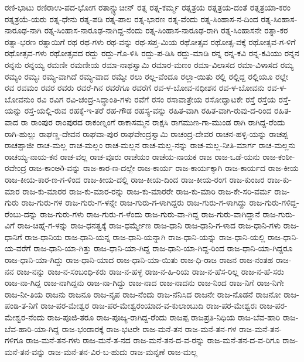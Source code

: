ರಣಿ-ಭಾಟು
ರಣಿರಾಉ-ಪದ-ಭೋಗ
ರತಾನ್ಚ್ಛುಚೀನ್
ರತ್ನ
ರತ್ನ-ಕರ್ಮ್ಮ
ರತ್ನತ್ರಯ
ರತ್ನತ್ರಯ-ದಂತೆ
ರತ್ನತ್ರಯಾ-ಕರಂ
ರತ್ನತ್ರಯೆ-ಯರು
ರತ್ನ-ಧೇನು
ರತ್ನ-ಪಡಿ
ರತ್ನ-ಪಾಲ
ರತ್ನ-ಭಾರಣ
ರತ್ನ-ವೆಂದು
ರತ್ನ-ಸಿಂಹಾಸ-ನ-ದಿಂದ
ರತ್ನ-ಸಿಂಹಾಸ-ನಾರೂಢ-ನಾಗಿ
ರತ್ನ-ಸಿಂಹಾಸ-ನಾರೂಢ-ನಾಗಿದ್ದ-ನೆಂದು
ರತ್ನ-ಸಿಂಹಾಸ-ನಾರೂಢ-ರಾಗಿ
ರತ್ನ-ಸಿಂಹಾಸನೇ
ರತ್ನಾ-ಕರ
ರತ್ನಾ-ಭರಣ
ರತ್ನಾಯಿಗೆ
ರಥ
ರಥ-ಗಳು
ರಥ-ವನ್ನು
ರಥ-ಸಪ್ತ-ಮಿಯ
ರಥೋತ್ಸವ
ರಥೋತ್ಸ-ವಕ್ಕೆ
ರಥೋತ್ಸವ-ಗ-ಳಿಗೆ
ರಥೋತ್ಸವ-ಗಳು
ರಥೋತ್ಸವದ
ರದ್ದು
ರದ್ದು-ಗೊ-ಳಿಸಿ
ರದ್ದು-ಪ-ಡಿಸಿ
ರದ್ದು-ಮಾಡಿ
ರನ್ನ
ರನ್ನ-ಕವಿ
ರನ್ನ-ಕವಿಯು
ರನ್ನನ
ರನ್ನನು
ರನ್ನಯ್ಯ
ರಮಣೀ
ರಮಣೀಯ
ರಮಾ-ನಾಥಸ್ವಾಮಿ
ರಮಾರ-ಮಣಂ
ರಮಾ-ವಿಲಾಸದ
ರಮಾ-ವಿಳಾಸದ
ರಮ್ಯ
ರಮ್ಯಂ
ರಮ್ಯಃ
ರಮ್ಯ-ವಾಗಿದೆ
ರಮ್ಯ-ವಾದ
ರಮ್ಯೇ
ರಲು
ರಲ್ಲ-ವೆಂದೂ
ರಲ್ಲಾ-ಯಿತು
ರಲ್ಲಿ
ರಲ್ಲಿದ್ದ
ರಲ್ಲಿಯೂ
ರಲ್ಲೇ
ರವ
ರವಮಂ
ರವರ
ರವರು
ರವರೆ-ಗಿನ
ರವರೆಗೂ
ರವರೆಗೆ
ರವ-ಳ-ಬೋವ-ನಧೀಶನ
ರವ-ಳ-ಬೋವನು
ರವ-ಳ-ಬೋವನುಂ
ರವಿ
ರವಿಗ
ರವಿ-ಚಂದ್ರ-ಸಿದ್ಧಾಂತಿ-ಗಳು
ರವೆಗೆ
ರಸಂ
ರಸಾವಾತ್ರೇಯ
ರಸೋದ್ಘಾಟಕೇ
ರಸ್ತೆ
ರಸ್ತೆಯ
ರಸ್ತೆ-ಯನ್ನು
ರಸ್ತೆ-ಯಲ್ಲಿ-ರುವ
ರಹಕ್ಕೆ-ಇ-ತರೆ
ರಹ-ಗೌಡ
ರಹಸ್ಯ-ವನ್ನು
ರಹಿತ-ವಾಗಿ
ರಹಿತ-ವಾಗಿ-ರುವು-ದ-ರಿಂದ
ರಹಿತ-ವಾದ
ರಾ
ರಾಂಪುರ
ರಾಂಪುರದ
ರಾಕಂಣ್ನಂಗೆ
ರಾಕಾಸಮ್ಮನ
ರಾಕ್ಷಸಿ
ರಾಗಮುಣ-ಗಾ-ಮುಂಡ
ರಾಗಿ
ರಾಗಿದ್ದ-ರೆಂದು
ರಾಗಿ-ಹುಲ್ಲು
ರಾಘಣ್ಣ-ದೇವನ
ರಾಘವಾ-ಪುರ
ರಾಘವೇಂದ್ರಸ್ವಾಮಿ
ರಾಚಂದ್ರ-ದೇವರ
ರಾಚನ-ಹಳ್ಳಿ-ಯನ್ನು
ರಾಚಪ್ಪ
ರಾಚಪ್ಪಾಜೀ
ರಾಚ-ಮಲ್ಲ
ರಾಚ-ಮಲ್ಲಂ
ರಾಚ-ಮಲ್ಲನ
ರಾಚ-ಮಲ್ಲ-ನನ್ನು
ರಾಚ-ಮಲ್ಲ-ನೀತಿ-ಮಾರ್ಗ
ರಾಚ-ಮಲ್ಲನು
ರಾಚಯ್ಯ-ನಾಯ-ಕನ
ರಾಚ-ವಲ್ಲ
ರಾಚ-ವೂರು
ರಾಚೆಯಂ
ರಾಚೆಯ-ನಾಯಕ
ರಾಜ
ರಾಜ-ಒಡೆ-ಯನು
ರಾಜ-ಕಂಠೀ-ರವೇಂದ್ರ
ರಾಜ-ಕಾಂಅð-ವನ್ನು
ರಾಜ-ಕಾರ-ಣ-ದಲ್ಲೇ
ರಾಜ-ಕಾರ್ಯ
ರಾಜ-ಕಾರ್ಯಕ್ಕಾಗಿ
ರಾಜ-ಕಾರ್ಯದ
ರಾಜ-ಕೀಯ
ರಾಜ-ಕೀಯ-ಕಾರ-ಣ-ಗ-ಳಿಂದ
ರಾಜ-ಕೀಯ-ದಲ್ಲಿ
ರಾಜ-ಕೀಯ-ದಿಂದ
ರಾಜ-ಕೀಯ-ರಂಗ
ರಾಜ-ಕುಂಜರ
ರಾಜ-ಕು-ಮಾರ
ರಾಜ-ಕು-ಮಾರರ
ರಾಜ-ಕು-ಮಾರ-ರನ್ನು
ರಾಜ-ಕು-ಮಾರರೇ
ರಾಜ-ಕು-ಮಾರಿ
ರಾಜ-ಕೇ-ಸರಿ-ವರ್ಮ
ರಾಜ-ಗುರು
ರಾಜ-ಗುರು-ಗಳ
ರಾಜ-ಗುರು-ಗ-ಳನ್ನೇ
ರಾಜ-ಗುರು-ಗ-ಳಾಗಿದ್ದರು
ರಾಜ-ಗುರು-ಗ-ಳಾಗಿದ್ದು
ರಾಜ-ಗುರು-ಗಳಿದ್ದ-ರೆಂಬು-ದನ್ನು
ರಾಜ-ಗುರು-ಗಳು
ರಾಜ-ಗುರು-ಗ-ಳೆಂದು
ರಾಜ-ಗುರು-ವಾ-ಗಿದ್ದ
ರಾಜ-ಗುರು-ವಾಗಿದ್ದಾನೆ
ರಾಜ-ಗುರು-ವಿಗೆ
ರಾಜ-ಚಿಹ್ನೆ-ಗ-ಳನ್ನು
ರಾಜ-ಧನತ್ವಕ್ಕೆ
ರಾಜ-ಧರ್ಮ್ಮೇಣ
ರಾಜ-ಧಾನಿ
ರಾಜ-ಧಾನಿ-ಗ-ಳಾದ
ರಾಜ-ಧಾನಿ-ಗಳು
ರಾಜ-ಧಾನಿಗೆ
ರಾಜ-ಧಾನಿಯ
ರಾಜ-ಧಾನಿ-ಯನ್ನ
ರಾಜ-ಧಾನಿ-ಯನ್ನಾಗಿ
ರಾಜ-ಧಾನಿ-ಯನ್ನು
ರಾಜ-ಧಾನಿ-ಯಲ್ಲಿ
ರಾಜ-ಧಾನಿ-ಯ-ವರೆಗೆ
ರಾಜ-ಧಾನಿ-ಯಾ-ಗಿತ್ತು
ರಾಜ-ಧಾನಿ-ಯಾ-ಗಿದ್ದ
ರಾಜ-ಧಾನಿ-ಯಾ-ಗಿದ್ದ-ರಿಂದ
ರಾಜ-ಧಾನಿ-ಯಾ-ಗಿದ್ದರೂ
ರಾಜ-ಧಾನಿ-ಯಾ-ಗಿದ್ದು
ರಾಜ-ಧಾನಿ-ಯಾದ
ರಾಜ-ಧಾನಿ-ಯಾ-ಯಿತು
ರಾಜ-ಧಿ-ರಾಜ
ರಾಜನ
ರಾಜ-ನಂತಹ
ರಾಜ-ನನ
ರಾಜ-ನನ್ನು
ರಾಜ-ನ-ಸಂಬಂಧಿ-ಕರು
ರಾಜ-ನ-ಹಳ್ಳ
ರಾಜ-ನ-ಹಿ-ರಿಯ
ರಾಜ-ನ-ಹೆಸ-ರಿಲ್ಲ
ರಾಜ-ನ-ಹೆ-ಸರು
ರಾಜ-ನಾ-ಗಿದ್ದ
ರಾಜ-ನಾಗಿದ್ದನು
ರಾಜ-ನಾ-ಗಿದ್ದು
ರಾಜ-ನಾದ
ರಾಜ-ನಾದನು
ರಾಜ-ನಿಂದ
ರಾಜ-ನಿಗೆ
ರಾಜ-ನಿಗೇ
ರಾಜ-ನೀ-ತಿಯ
ರಾಜನು
ರಾಜನೂ
ರಾಜ-ನೃಪ
ರಾಜ-ನೆಂದು
ರಾಜ-ನೆನಿಸಿದ
ರಾಜನೇ
ರಾಜ-ನೊಡನೆ
ರಾಜನೋ
ರಾಜ-ಪಂಡಿ-ತ-ನಿಗೆ
ರಾಜ-ಪರ-ಮೇಶ್ವರ
ರಾಜ-ಪರ-ಮೇಶ್ವರಂಯಾದ-ವ-ಕುಲಾಂಬುದಿ
ರಾಜ-ಪರ-ಮೇಶ್ವರಃ
ರಾಜ-ಪರ-ಮೇಶ್ವರ-ನೆಂದು
ರಾಜ-ಪೂಜಿ-ತರೂ
ರಾಜ-ಪೂಜ್ಯ-ರಾಗಿದ್ದ-ರೆಂದು
ರಾಜಪ್ಪ
ರಾಜಪ್ರತಿ-ನಿಧಿಯ
ರಾಜ-ಬೆವ-ಹಾರಿ
ರಾಜ-ಬೆವ-ಹಾರಿ-ಯಾ-ಗಿದ್ದ
ರಾಜ-ಭಂಡಾರಕ್ಕೆ
ರಾಜ-ಭಟರೇ
ರಾಜ-ಮನೆ-ತನ
ರಾಜ-ಮನೆ-ತನ-ಗಳ
ರಾಜ-ಮನೆ-ತನ-ಗಳಿಗೂ
ರಾಜ-ಮನೆ-ತನ-ಗಳು
ರಾಜ-ಮನೆ-ತ-ನದ
ರಾಜ-ಮನೆ-ತನ-ದ-ವ-ರನ್ನು
ರಾಜ-ಮನೆ-ತನ-ದ-ವ-ರಿಗೂ
ರಾಜ-ಮನೆ-ತನ-ವನ್ನು
ರಾಜ-ಮನೆ-ತನ-ವಿರ-ಬ-ಹುದು
ರಾಜ-ಮನ್ನಣೆ
ರಾಜ-ಮಲ್ಲ

